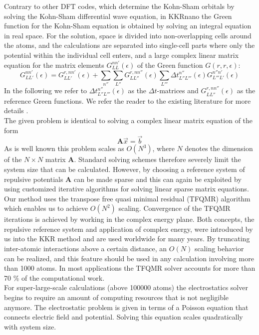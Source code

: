 \documentclass [a4paper, 12pt]{article}
\newcommand{\matr}[1]{\bm{#1}}
\begin{document}
Contrary to other DFT codes, which determine the Kohn-Sham orbitals by solving
the Kohn-Sham differential wave equation, in KKRnano the Green function for the Kohn-Sham
equation is obtained by solving an integral equation in real space. For the solution, space is divided
into non-overlapping cells around the atoms, and the calculations are separated into single-cell parts
where only the potential within the individual cell enters, and a large complex linear matrix equation for 
the matrix elements $G_{LL}^{nn'} (\epsilon)$ of the Green function $G(r, r , \epsilon)$:
\begin{equation}
	G_{LL'}^{nn'} (\epsilon) = G_{LL'}^{r,nn'} (\epsilon) + \sum_{n''} \sum_{L''}
	G_{LL''}^{r,nn''} (\epsilon) \sum_{L'''} \Delta t_{L'' L'''}^{n''} (\epsilon)
	G_{L'''L'}^{n''n'} (\epsilon)
	\label{eq:dyson_eq}
\end{equation}
In the following we refer to $\Delta t_{L'' L'''}^{n''} (\epsilon)$ as the $\Delta t$-matrices and
$G_{LL''}^{r,nn''} (\epsilon)$ as the reference Green functions. We refer the reader to the existing
literature for more details \cite{zeller_towards_2008}.
\\
The given problem is identical to solving a complex linear matrix equation of the form
\begin{equation}
	\matr{A} \vec{x} = \vec{b}
\end{equation}
As is well known this problem scales as $O(N^3)$, where $N$ denotes the dimension of the $N \times N$
matrix $\matr{A}$. Standard solving schemes therefore severely limit the system size that can
be calculated.
However, by choosing a reference system of repulsive potentials
$\matr{A}$ can be made sparse and this can again be exploited
by using customized iterative algorithms for solving linear sparse matrix equations.
Our method uses the transpose free quasi minimal residual (TFQMR) algorithm \cite{freund_qmr:_1991}
which enables us to achieve $O(N^2)$ scaling. 
Convergence of the TFQMR iterations is achieved by working in the complex energy plane. Both concepts,
the repulsive reference system and application of complex energy, were
introduced by us into the KKR method \cite{zeller_application_1982,zeller_theory_1995}
and are used worldwide for many years. 
By truncating inter-atomic interactions above a certain distance, an $O(N)$ scaling 
behavior can be realized, and this feature should be used in any calculation involving more than 1000 atoms.
In most applications the TFQMR solver accounts for more than 70 \% of the computational work.
\\
For super-large-scale calculations (above 100000 atoms) the electrostatics solver begins
to require an amount of computing resources that is not negligible anymore. 
The electrostatic problem is given in terms of a Poisson equation that connects electric field and potential. 
Solving this equation scales quadratically with system size. 
\end{document}
